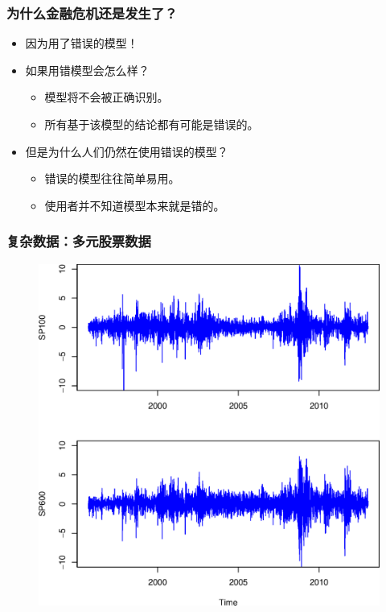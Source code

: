 \documentclass[11pt]{beamer}
\begin{document}
\begin{frame}
  \frametitle{为什么金融危机还是发生了？ }
\begin{itemize}
\item  因为用了错误的模型！
\item  如果用错模型会怎么样？
  \begin{itemize}
  \item 模型将不会被正确识别。
  \item 所有基于该模型的结论都有可能是错误的。
  \end{itemize}

\item 但是为什么人们仍然在使用错误的模型？

  \begin{itemize}
  \item 错误的模型往往简单易用。
  \item 使用者并不知道模型本来就是错的。
  \end{itemize}

\end{itemize}
\end{frame}



\begin{frame}
  \frametitle{复杂数据：多元股票数据}
  \begin{figure}
    \centering
    \includegraphics[height=0.9\textheight]{SP100-SP600}
  \end{figure}
\end{frame}
\end{document}
